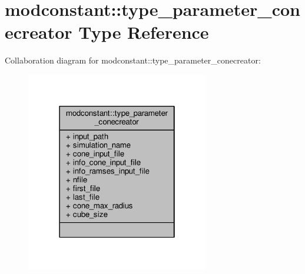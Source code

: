 \hypertarget{structmodconstant_1_1type__parameter__conecreator}{}\section{modconstant\+:\+:type\+\_\+parameter\+\_\+conecreator Type Reference}
\label{structmodconstant_1_1type__parameter__conecreator}


Collaboration diagram for modconstant\+:\+:type\+\_\+parameter\+\_\+conecreator\+:\nopagebreak
\begin{figure}[H]
\begin{center}
\leavevmode
\includegraphics[width=226pt]{structmodconstant_1_1type__parameter__conecreator__coll__graph}
\end{center}
\end{figure}
